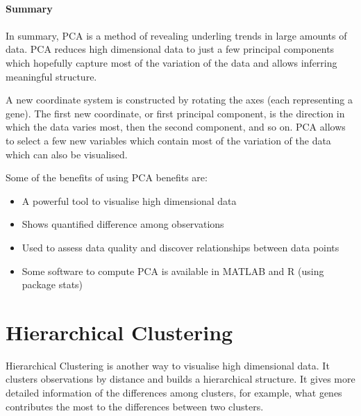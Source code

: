 \documentclass[11pt, oneside]{article}   	%
\begin{document}
\paragraph{Summary}
\paragraph{}

In summary, PCA is a method of revealing underling trends in large amounts of data. PCA reduces high dimensional data to just a few principal components which hopefully capture most of the variation of the data and allows inferring meaningful structure.

A new coordinate system is constructed by rotating the axes (each representing a gene). The first new coordinate, or first principal component, is the direction in which the data varies most, then the second component, and so on. PCA allows to select a few new variables which contain most of the variation of the data which can also be visualised.


Some of the benefits of using PCA benefits are:

\begin{itemize}

   \item A powerful tool to visualise high dimensional data 

   \item Shows quantified difference among observations

   \item Used to assess data quality and discover relationships between data points
   
   \item Some software to compute PCA is available in MATLAB and R (using package stats)

\end{itemize}





\section{Hierarchical Clustering}

Hierarchical Clustering is another way to visualise high dimensional data. 
It clusters observations by distance and builds a hierarchical structure.
It gives more detailed information of the differences among clusters, for example, what genes contributes the most to the differences between two clusters.
\end{document}
